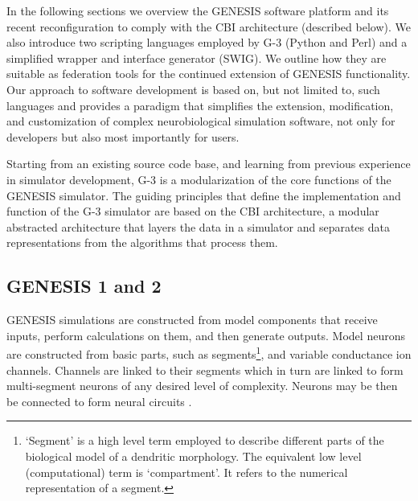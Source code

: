 \documentclass[10pt]{article}
\begin{document}
In the following sections we overview the GENESIS software platform
and its recent reconfiguration to comply with the CBI architecture
(described below). We also introduce two scripting languages employed
by G-3 (Python and Perl) and a simplified wrapper and interface
generator (SWIG). We outline how they are suitable as federation tools
for the continued extension of GENESIS functionality. Our approach to
software development is based on, but not limited to, such languages
and provides a paradigm that simplifies the extension, modification,
and customization of complex neurobiological simulation software, not
only for developers but also most importantly for users.

Starting from an existing source code base, and learning from
previous experience in simulator development, G-3 is a modularization of the core functions of the GENESIS
simulator.  The guiding principles that define the implementation and
function of the G-3 simulator are based on the CBI
architecture, a modular abstracted architecture
that layers the data in a simulator and separates data
representations from the algorithms that process them.

\subsection*{GENESIS 1 and 2}
\label{sec:genesis}


GENESIS simulations are constructed from model components that receive
inputs, perform calculations on them, and then generate outputs. Model
neurons are constructed from basic parts, such as segments\footnote{`Segment' is a high level term employed to describe different parts of the biological model of a dendritic morphology. The equivalent low level (computational) term is `compartment'. It refers to the numerical representation of a segment.}, and
variable conductance ion channels. Channels are linked to their
segments which in turn are linked to form
multi-segment neurons of any desired level of complexity.
Neurons may be then be connected to form neural circuits \cite{bower98:_book_genes}. 
\end{document}
